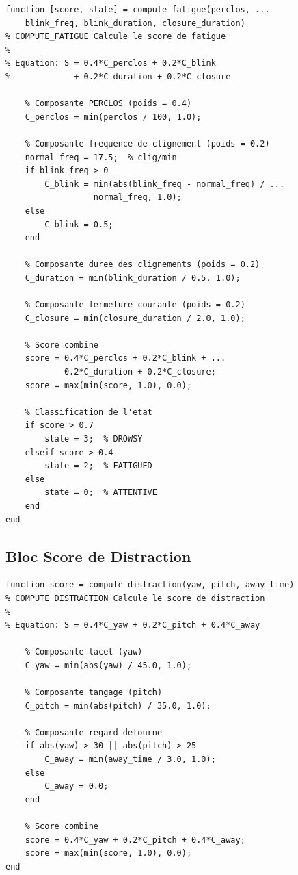 \documentclass[12pt,a4paper,twoside]{report}
\begin{document}
\begin{lstlisting}[style=matlabstyle, caption={Calcul du score de fatigue en MATLAB.}, label={lst:fatigue_matlab}]
function [score, state] = compute_fatigue(perclos, ...
    blink_freq, blink_duration, closure_duration)
% COMPUTE_FATIGUE Calcule le score de fatigue
%
% Equation: S = 0.4*C_perclos + 0.2*C_blink 
%             + 0.2*C_duration + 0.2*C_closure

    % Composante PERCLOS (poids = 0.4)
    C_perclos = min(perclos / 100, 1.0);
    
    % Composante frequence de clignement (poids = 0.2)
    normal_freq = 17.5;  % clig/min
    if blink_freq > 0
        C_blink = min(abs(blink_freq - normal_freq) / ...
                  normal_freq, 1.0);
    else
        C_blink = 0.5;
    end
    
    % Composante duree des clignements (poids = 0.2)
    C_duration = min(blink_duration / 0.5, 1.0);
    
    % Composante fermeture courante (poids = 0.2)
    C_closure = min(closure_duration / 2.0, 1.0);
    
    % Score combine
    score = 0.4*C_perclos + 0.2*C_blink + ...
            0.2*C_duration + 0.2*C_closure;
    score = max(min(score, 1.0), 0.0);
    
    % Classification de l'etat
    if score > 0.7
        state = 3;  % DROWSY
    elseif score > 0.4
        state = 2;  % FATIGUED
    else
        state = 0;  % ATTENTIVE
    end
end
\end{lstlisting}

\subsection{Bloc Score de Distraction}

\begin{lstlisting}[style=matlabstyle, caption={Calcul du score de distraction en MATLAB.}, label={lst:distraction_matlab}]
function score = compute_distraction(yaw, pitch, away_time)
% COMPUTE_DISTRACTION Calcule le score de distraction
%
% Equation: S = 0.4*C_yaw + 0.2*C_pitch + 0.4*C_away

    % Composante lacet (yaw)
    C_yaw = min(abs(yaw) / 45.0, 1.0);
    
    % Composante tangage (pitch)
    C_pitch = min(abs(pitch) / 35.0, 1.0);
    
    % Composante regard detourne
    if abs(yaw) > 30 || abs(pitch) > 25
        C_away = min(away_time / 3.0, 1.0);
    else
        C_away = 0.0;
    end
    
    % Score combine
    score = 0.4*C_yaw + 0.2*C_pitch + 0.4*C_away;
    score = max(min(score, 1.0), 0.0);
end
\end{lstlisting}
\end{document}

